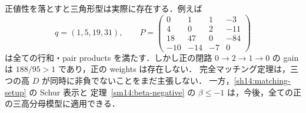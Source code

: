 \begin{remark}[正値性の仮定と適用範囲]
\label{mh18:positivity-essential}
正値性を落とすと三角形型は実際に存在する．例えば
\[
 q=(1,5,19,31),\qquad
 P=\begin{pmatrix}
 0&1&1&-3\\
 4&0&2&-11\\
 18&47&0&-84\\
 -10&-14&-7&0
 \end{pmatrix}
\]
は全ての行和・pair products を満たす．しかし正の閉路 $0\to2\to1\to0$ の gain は
$188/95>1$ であり，正の weights は存在しない．
完全マッチング定理は，三つの高 $D$ が同時に非負でないことをまだ主張しない．
一方，\ref{sh14:matching-setup} の Schur 表示と
定理~\ref{sm14:beta-negative} の $\beta\le-1$ は，今後，全ての正の三高分母模型に適用できる．
\end{remark}
